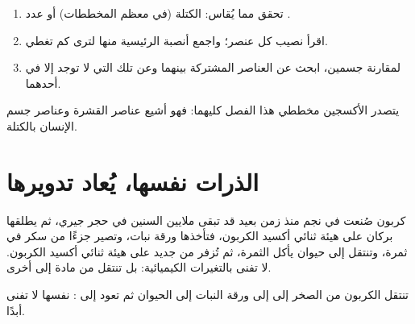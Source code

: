 \begin{method}\label{met:g9:elements-universe-earth:read}
\begin{enumerate}
  \item تحقق مما يُقاس: الكتلة (في معظم المخططات) أو عدد .
  \item اقرأ نصيب كل عنصر؛ واجمع أنصبة الرئيسية منها لترى كم
        تغطي.
  \item لمقارنة جسمين، ابحث عن العناصر المشتركة بينهما وعن تلك التي
        لا توجد إلا في أحدهما.
\end{enumerate}
يتصدر الأكسجين مخططي هذا الفصل كليهما: فهو أشيع عناصر القشرة وعناصر جسم
الإنسان بالكتلة.
\end{method}

\section{الذرات نفسها، يُعاد تدويرها}

\begin{example}\label{ex:g9:elements-universe-earth:journey}
 كربون صُنعت في نجم منذ زمن بعيد قد تبقى ملايين السنين في حجر جيري،
ثم يطلقها بركان على هيئة ثنائي أكسيد الكربون، فتأخذها ورقة نبات، وتصير جزءًا
من سكر في ثمرة، وتنتقل إلى حيوان يأكل الثمرة، ثم تُزفر من جديد على هيئة
ثنائي أكسيد الكربون.  لا تفنى بالتغيرات الكيميائية: بل تنتقل من
مادة إلى أخرى.
\end{example}

\begin{omfigure}

{\small تنتقل  الكربون من الصخر إلى  إلى ورقة النبات إلى الحيوان ثم
تعود إلى :  نفسها لا تفنى أبدًا.}
\end{omfigure}

